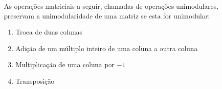 \begin{lemma}
  As operações matriciais a seguir, chamadas de operações unimodulares, preservam a unimodularidade de uma matriz se esta for unimodular:
\begin{enumerate}
    \item Troca de duas colunas
    \item Adição de um múltiplo inteiro de uma coluna a outra coluna
    \item Multiplicação de uma coluna por $-1$
    \item Transposição
\end{enumerate}
\end{lemma}

